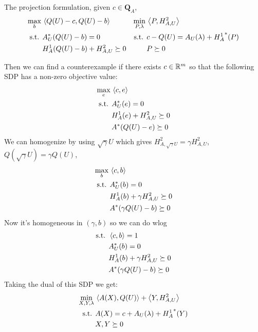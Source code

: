 \documentclass[11pt]{article}
\newcommand{\APsd}{\mathbf{Q}_A}
\begin{document}
The projection formulation, given $c \in \APsd$,
\begin{align*}
  \max_b \, & \left\langle Q(U) - c, Q(U) - b \right\rangle &
  \min_{P, \lambda} \, & \left\langle P, H^2_{A, U} \right\rangle \\
  \text{s.t. } & A_U^*(Q(U) - b) = 0 &
  \text{s.t. } & c - Q(U) = A_U(\lambda) + {H^1_A}^*(P) \\
         & H^1_A(Q(U) - b) + H^2_{A, U} \succeq 0 &
         & P \succeq 0
\end{align*}


Then we can find a
counterexample if there exists $c \in \mathbb{R}^m$ so that the following SDP has a
non-zero objective value:
\begin{align*}
  \max_e \, & \left\langle c, e \right\rangle \\
  \text{s.t. } & A_U^*(e) = 0 \\
         & H^1_A(e) + H^2_{A, U} \succeq 0 \\
         &  A^*(Q(U) - e) \succeq 0
\end{align*}
We can homogenize by using $\sqrt{\gamma}U$ which gives
$H^2_{A, \sqrt{\gamma}U} = \gamma H^2_{A, U}$,
$Q(\sqrt{\gamma}U) = \gamma Q(U)$,
\begin{align*}
  \max_b \, & \left\langle c, b \right\rangle \\
  \text{s.t. } & A_U^*(b) = 0 \\
         & H^1_A(b) + \gamma H^2_{A, U} \succeq 0 \\
         &  A^*(\gamma Q(U) - b) \succeq 0
\end{align*}
Now it's homogeneous in $(\gamma, b)$ so we can do wlog
\begin{align*}
  \text{s.t. } & \left\langle c, b \right\rangle = 1 \\
  & A_U^*(b) = 0 \\
         & H^1_A(b) + \gamma H^2_{A, U} \succeq 0 \\
         &  A^*(\gamma Q(U) - b) \succeq 0
\end{align*}
Taking the dual of this SDP we get:
\begin{align*}
  \min_{X, Y, \lambda} \, & \left\langle A(X), Q(U) \right\rangle + \left\langle Y, H^2_{A, U} \right\rangle \\
  \text{s.t. } & A(X) = c + A_U(\lambda) + {H^1_A}^*(Y)  \\
                          & X, Y \succeq 0
\end{align*}
\end{document}
